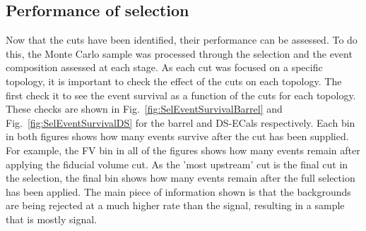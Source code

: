 \subsection{Performance of selection}
\label{subsec:SelectionPerformance}
Now that the cuts have been identified, their performance can be assessed.  To do this, the Monte Carlo sample was processed through the selection and the event composition assessed at each stage.  As each cut was focused on a specific topology, it is important to check the effect of the cuts on each topology.  The first check it to see the event survival as a function of the cuts for each topology.  These checks are shown in Fig.~\ref{fig:SelEventSurvivalBarrel} and Fig.~\ref{fig:SelEventSurvivalDS} for the barrel and DS-ECals respectively.  Each bin in both figures shows how many events survive after the cut has been supplied.  For example, the FV bin in all of the figures shows how many events remain after applying the fiducial volume cut.  As the 'most upstream' cut is the final cut in the selection, the final bin shows how many events remain after the full selection has been applied.  The main piece of information shown is that the backgrounds are being rejected at a much higher rate than the signal, resulting in a sample that is mostly signal.
